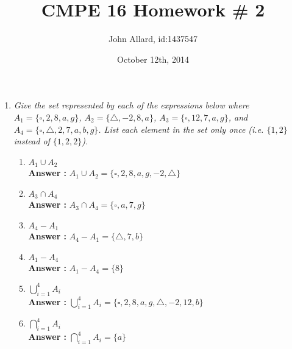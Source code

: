\documentclass[a4paper,11pt]{article}
\title{ CMPE 16 Homework \# 2}
\author{John Allard, id:1437547}
\date{October 12th, 2014}
\begin{document}
\maketitle

\begin{enumerate}

\item \emph{Give the set represented by each of the expressions below where  $A_1 = \{ \square, 2, 8, a, g \}$,
$A_2 = \{\triangle, -2, 8, a\}$, $A_3 = \{\square, 12, 7, a, g\}$, and $A_4 = \{\square,\triangle,  2, 7, a, b, g\}$. List each element in the set only once (i.e. $\{1, 2\}$ instead of $\{1, 2, 2 \}$).}

  \begin{enumerate}
  \item $A_1 \cup A_2$ \\
  \textbf{Answer :} $A_1 \cup A_2 = \{\square, 2, 8, a, g, -2, \triangle \}$
  \item $A_3 \cap A_4$ \\
  \textbf{Answer :} $A_3 \cap A_4 = \{\square, a, 7, g \}$
  \item $A_4 - A_1$ \\
  \textbf{Answer :} $A_4 - A_1 = \{ \triangle, 7, b \}$
  \item $A_1 - A_4$ \\
  \textbf{Answer :} $A_1 - A_4 = \{ 8 \}$
  \item $\bigcup_{i=1}^{4} A_i$ \\
  \textbf{Answer :} $\bigcup_{i=1}^{4} A_i = \{ \square, 2, 8, a, g, \triangle, -2, 12, b  \}$
  \item $\bigcap_{i=1}^{4} A_i$ \\
  \textbf{Answer :} $\bigcap_{i=1}^{4} A_i = \{ a  \}$
  \end{enumerate}

\end{enumerate}
\end{document}
